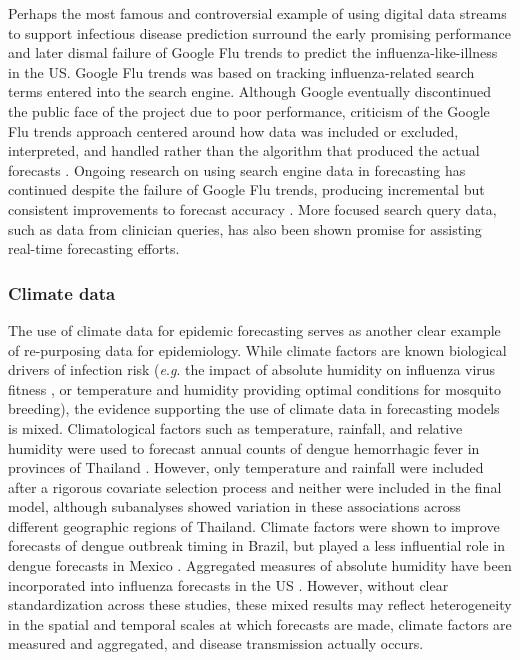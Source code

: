 \documentclass[a4paper]{article}
\newcommand{\eg}{\textit{e}.\textit{g}. }
\begin{document}
Perhaps the most famous and controversial example of using digital data streams to support infectious disease prediction surround the early promising performance\cite{Ginsberg2009, Dugas2012} and later dismal failure \cite{Lazer2014} of Google Flu trends to predict the influenza-like-illness in the US.  
Google Flu trends was based on tracking influenza-related search terms entered into the search engine.  
Although Google eventually discontinued the public face of the project due to poor performance, criticism of the Google Flu trends approach centered around how data was included or excluded, interpreted, and handled rather than the algorithm that produced the actual forecasts \cite{Santillana2014, Olson2013}.
Ongoing research on using search engine data in forecasting has continued despite the failure of Google Flu trends, producing incremental but consistent improvements to forecast accuracy \cite{Yang2017, Yang2015, McGough2017,Lu2018,osthus2019even}.
More focused search query data, such as data from clinician queries, has also been shown promise for assisting real-time forecasting efforts.\cite{santillana2014using,thorner2016correlation}


\subsubsection*{Climate data} \label{sub:climdata}

The use of climate data for epidemic forecasting serves as another clear example of re-purposing data for epidemiology. 
While climate factors are known biological drivers of infection risk (\eg the impact of absolute humidity on influenza virus fitness \cite{shaman2009absolute}, or temperature and humidity providing optimal conditions for mosquito breeding), the evidence supporting the use of climate data in forecasting models is mixed.
Climatological factors such as temperature, rainfall, and relative humidity were used to forecast annual counts of dengue hemorrhagic fever in provinces of Thailand \cite{lauer2018prospective}.
However, only temperature and rainfall were included after a rigorous covariate selection process and neither were included in the final model, although subanalyses showed variation in these associations across different geographic regions of Thailand.
Climate factors were shown to improve forecasts of dengue outbreak timing in Brazil\cite{Lowe2017}, but played a less influential role in dengue forecasts in Mexico \cite{Johansson2016}.
Aggregated measures of absolute humidity have been incorporated into influenza forecasts in the US \cite{Shaman2013, Yang2017}.
However, without clear standardization across these studies, these mixed results may reflect heterogeneity in the spatial and temporal scales at which forecasts are made, climate factors are measured and aggregated, and disease transmission actually occurs.
\end{document}
